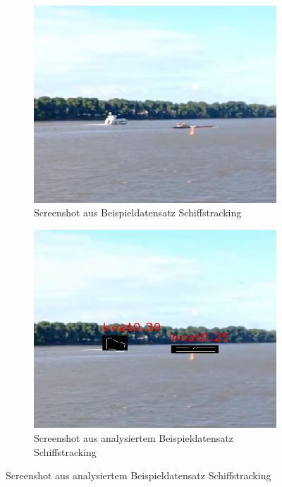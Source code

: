 {		
	\begin{figure}[ht]
		\centering
		\begin{subfigure}[b]{0.45\textwidth}
			\includegraphics[width=\textwidth]{images/Evaluation/shiptracking_raw.png}
			\caption{Screenshot aus Beispieldatensatz Schiffstracking}
		\end{subfigure} \hfill
		\begin{subfigure}[b]{0.45\textwidth}
			\includegraphics[width=\textwidth]{images/Evaluation/shiptracking_analyzed.png}
			\caption{Screenshot aus analysiertem Beispieldatensatz Schiffstracking}

\end{subfigure}
\end{figure}}
